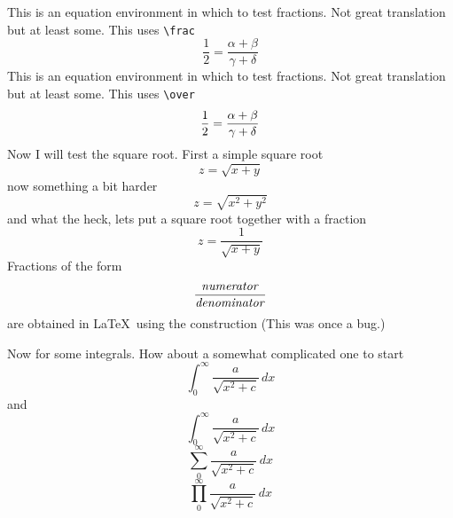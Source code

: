 \documentclass{article}
\begin{document}
This is an equation environment in which to test fractions.  Not great translation
but at least some.   This uses \verb#\frac#
$$
\frac{1}{2} = \frac{\alpha+\beta}{\gamma+\delta}
$$
This is an equation environment in which to test fractions.  Not great translation
but at least some.  This uses \verb#\over#
$$
{1 \over 2} = {\alpha+\beta \over \gamma+\delta}
$$
Now I will test the square root.  First a simple square root
$$
z = \sqrt{x+y}
$$
now something a bit harder
$$
z = \sqrt{x^2+y^2}
$$
and what the heck, lets put a square root together with a fraction
$$
z = \frac{1}{\sqrt{x+y}}
$$
Fractions of the form
\[ \frac{\mbox{\textit{numerator}}}{\mbox{\textit{denominator}}} \]
are obtained in \LaTeX\ using the construction (This was once a bug.)

Now for some integrals.  How about a somewhat complicated one to start
$$
\int_{0}^{\infty} \frac{a}{\sqrt{x^2+c}}\,dx
$$
and
$$
\int_0^\infty \frac{a}{\sqrt{x^2+c}}\,dx
$$
$$
\sum_0^\infty \frac{a}{\sqrt{x^2+c}}\,dx
$$
$$
\prod_0^\infty \frac{a}{\sqrt{x^2+c}}\,dx
$$
\end{document}
